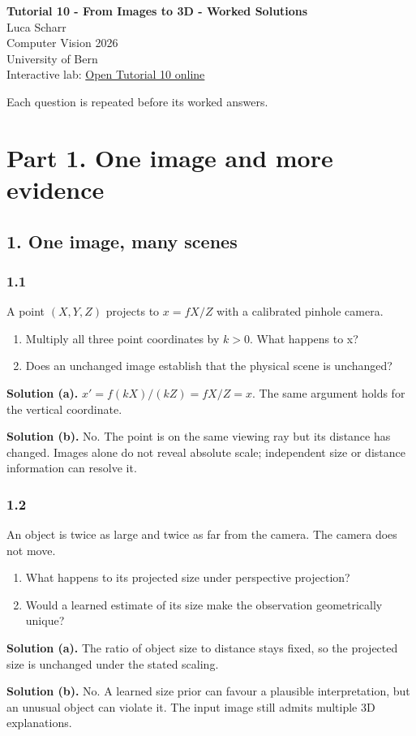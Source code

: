 \documentclass[11pt,a4paper]{article}
\begin{document}
\begin{center}
{\Large\bfseries Tutorial 10 - From Images to 3D - Worked Solutions}\\[2mm]
Luca Scharr\\
Computer Vision 2026\\
University of Bern\\[1mm]
Interactive lab: \href{https://sosekie.github.io/Unibe-CVG-CV-Interactive-Labs/tutorial-10/}{Open Tutorial 10 online}
\end{center}
Each question is repeated before its worked answers.
\section*{Part 1. One image and more evidence}
\subsection*{1. One image, many scenes}
\par
\noindent
\begin{minipage}{\linewidth}
\subsubsection*{1.1}
A point $(X,Y,Z)$ projects to $x=fX/Z$ with a calibrated pinhole camera.
\begin{enumerate}[label=(\alph*),nosep]
\item Multiply all three point coordinates by $k>0$.
What happens to x?
\item Does an unchanged image establish that the physical scene is unchanged?
\end{enumerate}
\noindent\textbf{Solution (a).} $x'=f(kX)/(kZ)=fX/Z=x$.
The same argument holds for the vertical coordinate.

\noindent\textbf{Solution (b).} No.
The point is on the same viewing ray but its distance has changed.
Images alone do not reveal absolute scale; independent size or distance information can resolve it.
\end{minipage}
\par\medskip
\par
\noindent
\begin{minipage}{\linewidth}
\subsubsection*{1.2}
An object is twice as large and twice as far from the camera.
The camera does not move.
\begin{enumerate}[label=(\alph*),nosep]
\item What happens to its projected size under perspective projection?
\item Would a learned estimate of its size make the observation geometrically unique?
\end{enumerate}
\noindent\textbf{Solution (a).} The ratio of object size to distance stays fixed, so the projected size is unchanged under the stated scaling.

\noindent\textbf{Solution (b).} No.
A learned size prior can favour a plausible interpretation, but an unusual object can violate it.
The input image still admits multiple 3D explanations.
\end{minipage}
\end{document}
